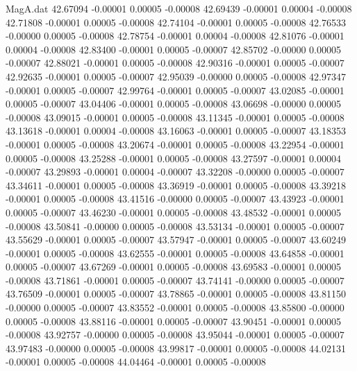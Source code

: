 \begin{filecontents}{MagA.dat}
  42.67094   -0.00001    0.00005   -0.00008
  42.69439   -0.00001    0.00004   -0.00008
  42.71808   -0.00001    0.00005   -0.00008
  42.74104   -0.00001    0.00005   -0.00008
  42.76533   -0.00000    0.00005   -0.00008
  42.78754   -0.00001    0.00004   -0.00008
  42.81076   -0.00001    0.00004   -0.00008
  42.83400   -0.00001    0.00005   -0.00007
  42.85702   -0.00000    0.00005   -0.00007
  42.88021   -0.00001    0.00005   -0.00008
  42.90316   -0.00001    0.00005   -0.00007
  42.92635   -0.00001    0.00005   -0.00007
  42.95039   -0.00000    0.00005   -0.00008
  42.97347   -0.00001    0.00005   -0.00007
  42.99764   -0.00001    0.00005   -0.00007
  43.02085   -0.00001    0.00005   -0.00007
  43.04406   -0.00001    0.00005   -0.00008
  43.06698   -0.00000    0.00005   -0.00008
  43.09015   -0.00001    0.00005   -0.00008
  43.11345   -0.00001    0.00005   -0.00008
  43.13618   -0.00001    0.00004   -0.00008
  43.16063   -0.00001    0.00005   -0.00007
  43.18353   -0.00001    0.00005   -0.00008
  43.20674   -0.00001    0.00005   -0.00008
  43.22954   -0.00001    0.00005   -0.00008
  43.25288   -0.00001    0.00005   -0.00008
  43.27597   -0.00001    0.00004   -0.00007
  43.29893   -0.00001    0.00004   -0.00007
  43.32208   -0.00000    0.00005   -0.00007
  43.34611   -0.00001    0.00005   -0.00008
  43.36919   -0.00001    0.00005   -0.00008
  43.39218   -0.00001    0.00005   -0.00008
  43.41516   -0.00000    0.00005   -0.00007
  43.43923   -0.00001    0.00005   -0.00007
  43.46230   -0.00001    0.00005   -0.00008
  43.48532   -0.00001    0.00005   -0.00008
  43.50841   -0.00000    0.00005   -0.00008
  43.53134   -0.00001    0.00005   -0.00007
  43.55629   -0.00001    0.00005   -0.00007
  43.57947   -0.00001    0.00005   -0.00007
  43.60249   -0.00001    0.00005   -0.00008
  43.62555   -0.00001    0.00005   -0.00008
  43.64858   -0.00001    0.00005   -0.00007
  43.67269   -0.00001    0.00005   -0.00008
  43.69583   -0.00001    0.00005   -0.00008
  43.71861   -0.00001    0.00005   -0.00007
  43.74141   -0.00000    0.00005   -0.00007
  43.76509   -0.00001    0.00005   -0.00007
  43.78865   -0.00001    0.00005   -0.00008
  43.81150   -0.00000    0.00005   -0.00007
  43.83552   -0.00001    0.00005   -0.00008
  43.85800   -0.00000    0.00005   -0.00008
  43.88116   -0.00001    0.00005   -0.00007
  43.90451   -0.00001    0.00005   -0.00008
  43.92757   -0.00000    0.00005   -0.00008
  43.95044   -0.00001    0.00005   -0.00007
  43.97483   -0.00000    0.00005   -0.00008
  43.99817   -0.00001    0.00005   -0.00008
  44.02131   -0.00001    0.00005   -0.00008
  44.04464   -0.00001    0.00005   -0.00008

\end{filecontents}
